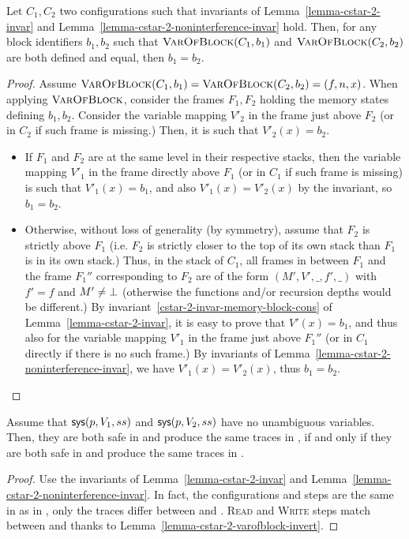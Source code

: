 \begin{lemma}
  Let $C_1, C_2$ two  configurations such that invariants of
  Lemma~\ref{lemma-cstar-2-invar} and
  Lemma~\ref{lemma-cstar-2-noninterference-invar} hold. Then, for any
  block identifiers $b_1, b_2$ such that $\textsc{VarOfBlock}(C_1,
  b_1)$ and $\textsc{VarOfBlock}(C_2, b_2)$ are both defined and
  equal, then $b_1 = b_2$.
\end{lemma}
\begin{proof}
   Assume $\textsc{VarOfBlock}(C_1, b_1) = \textsc{VarOfBlock}(C_2,
   b_2) = (f, n, x)$. When applying $\textsc{VarOfBlock}$, consider
   the frames $F_1, F_2$ holding the memory states defining $b_1,
   b_2$. Consider the variable mapping $V'_2$ in the frame just above
   $F_2$ (or in $C_2$ if such frame is missing.) Then, it is such that
   $V'_2(x) = b_2$.
  \begin{itemize}
  \item If $F_1$ and $F_2$ are at the same level in their respective
    stacks, then the variable mapping $V'_1$ in the frame directly
    above $F_1$ (or in $C_1$ if such frame is missing) is such that
    $V'_1(x) = b_1$, and also $V'_1(x) = V'_2(x)$ by the invariant, so
    $b_1 = b_2$.
  \item Otherwise, without loss of generality (by symmetry), assume
    that $F_2$ is strictly above $F_1$ (i.e. $F_2$ is strictly closer
    to the top of its own stack than $F_1$ is in its own stack.) Thus,
    in the stack of $C_1$, all frames in between $F_1$ and the frame
    $F_1''$ corresponding to $F_2$ are of the form $(M', V', \_, f',
    \_)$ with $f' = f$ and $M' \not= \bot$ (otherwise the functions
    and/or recursion depths would be different.) By
    invariant~\ref{cstar-2-invar-memory-block-cons} of
    Lemma~\ref{lemma-cstar-2-invar}, it is easy to prove that $V'(x) =
    b_1$, and thus also for the variable mapping $V'_1$ in the frame
    just above $F_1''$ (or in $C_1$ directly if there is no such
    frame.) By invariants of
    Lemma~\ref{lemma-cstar-2-noninterference-invar}, we have $V'_1(x)
    = V'_2(x)$, thus $b_1 = b_2$.
  \end{itemize}
\end{proof}
  
\begin{lemma}
  Assume that $\text{\textsf{sys}}(p, V_1, ss)$ and $\text{\textsf{sys}}(p, V_2, ss)$ have no
  unambiguous variables. Then, they are both safe in  and produce
  the same traces in , if and only if they are both safe in  and
  produce the same traces in .
\end{lemma}
\begin{proof}
  Use the invariants of Lemma~\ref{lemma-cstar-2-invar} and
  Lemma~\ref{lemma-cstar-2-noninterference-invar}. In fact, the
  configurations and steps are the same in  as in , only the
  traces differ between  and . \textsc{Read} and \textsc{Write}
  steps match between  and  thanks to
  Lemma~\ref{lemma-cstar-2-varofblock-invert}.
\end{proof}

